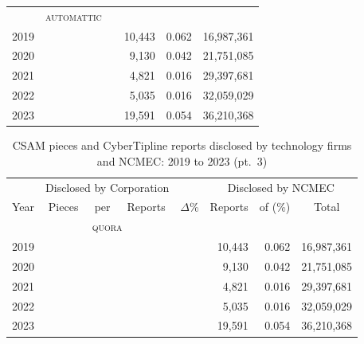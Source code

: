\documentclass[nonacm,screen]{acmart}
\begin{document}
\begin{itemize}
\begin{table}
\begin{tabular}{r@{\hskip 1.5em}rrr r@{\hskip 1.5em}rrr}
& \multicolumn{3}{c}{\textsc{\MakeLowercase{Automattic}}} & & & & \\ \cmidrule{2-4}
\color{lowlight} 2019 &             &        &           &          &     10,443 &  0.062 & \color{lowlight} 16,987,361 \\
\color{lowlight} 2020 &             &        &           &          &      9,130 &  0.042 & \color{lowlight} 21,751,085 \\
\color{lowlight} 2021 &             &        &           &          &      4,821 &  0.016 & \color{lowlight} 29,397,681 \\
\color{lowlight} 2022 &             &        &           &          &      5,035 &  0.016 & \color{lowlight} 32,059,029 \\
\color{lowlight} 2023 &             &        &           &          &     19,591 &  0.054 & \color{lowlight} 36,210,368 \\[2ex]

\bottomrule
\end{tabular}
\end{table}

\begin{table}
\centering\libertineLF

\caption{CSAM pieces and CyberTipline reports disclosed by technology firms and NCMEC: 2019 to 2023 (pt.\ 3)}
\label{tab:pieces-and-reports-3}

\begin{tabular}{r@{\hskip 1.5em}rrr r@{\hskip 1.5em}rrr}
\toprule
& \multicolumn{3}{c}{Disclosed by Corporation}
& \hspace{3.5em}
& \multicolumn{3}{c}{Disclosed by NCMEC} \\
\cmidrule{2-4}\cmidrule{6-8}

Year
& \multicolumn{1}{c}{Pieces}
& \multicolumn{1}{c}{per}
& \multicolumn{1}{c}{Reports}
& \multicolumn{1}{c}{$\Delta$\%}
& \multicolumn{1}{c}{Reports}
& \multicolumn{1}{c}{of (\%)}
& \multicolumn{1}{c}{Total}\\[2ex]

& \multicolumn{3}{c}{\textsc{\MakeLowercase{Quora}}} & & & & \\ \cmidrule{2-4}
\color{lowlight} 2019 &             &        &           &          &     10,443 &  0.062 & \color{lowlight} 16,987,361 \\
\color{lowlight} 2020 &             &        &           &          &      9,130 &  0.042 & \color{lowlight} 21,751,085 \\
\color{lowlight} 2021 &             &        &           &          &      4,821 &  0.016 & \color{lowlight} 29,397,681 \\
\color{lowlight} 2022 &             &        &           &          &      5,035 &  0.016 & \color{lowlight} 32,059,029 \\
\color{lowlight} 2023 &             &        &           &          &     19,591 &  0.054 & \color{lowlight} 36,210,368 \\[2ex]


\end{tabular}
\end{table}
\end{itemize}
\end{document}
